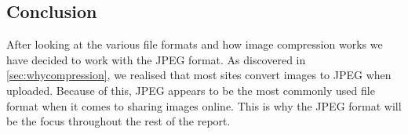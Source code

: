 \subsection*{Conclusion}
After looking at the various file formats and how image compression works we have decided to work with the JPEG format.
As discovered in \ref{sec:whycompression}, we realised that most sites convert images to JPEG when uploaded. 
Because of this, JPEG appears to be the most commonly used file format when it comes to sharing images online.
This is why the JPEG format will be the focus throughout the rest of the report.

